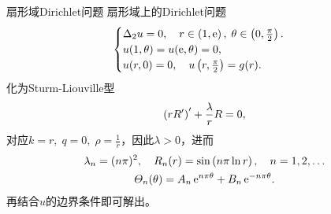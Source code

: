 \begin{example}{扇形域Dirichlet问题}{}
	扇形域上的Dirichlet问题
	\begin{align*}
		\begin{cases}
			\Delta_2u=0,\quad r\in\left(1,\mathrm e\right),\;\theta\in\left(0,\frac\pi{2}\right).\\
			u(1,\theta)=u(\mathrm e,\theta)=0,\\
			u(r,0)=0,\quad u\left(r,\frac\pi{2}\right)=g(r).
		\end{cases}
	\end{align*}
	化为Sturm-Liouville型
	\[
		\left(rR'\right)'+\frac{\lambda}rR=0,
	\]
	对应\(k=r,\;q=0,\;\rho=\frac1r\)，因此\(\lambda>0\)，进而
	\begin{gather*}
		\lambda_n=(n\pi)^2,\quad R_n(r)=\sin\left(n\pi\ln r\right),\quad n=1,2,\ldots
		\\
		\varTheta_n(\theta)=A_n\mathop{}\!\mathrm{e}^{n\pi\theta}+B_n\mathop{}\!\mathrm{e}^{-n\pi\theta}.
	\end{gather*}
	再结合$u$的边界条件即可解出。
\end{example}
